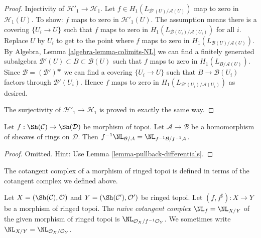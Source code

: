 \begin{proof}
\medskip\noindent
Injectivity of $\mathcal{H}'_1 \to \mathcal{H}_1$. Let
$f \in H_1(L_{\mathcal{B}'(U)/\mathcal{A}(U)})$ map to zero
in $\mathcal{H}_1(U)$. To show: $f$ maps to zero in
$\mathcal{H}'_1(U)$. The assumption means there is a covering
$\{U_i \to U\}$ such that $f$ maps to zero in
$H_1(L_{\mathcal{B}(U_i)/\mathcal{A}(U_i)})$ for all $i$.
Replace $U$ by $U_i$ to get to the point where $f$ maps to zero
in $H_1(L_{\mathcal{B}(U)/\mathcal{A}(U)})$.
By Algebra, Lemma \ref{algebra-lemma-colimits-NL}
we can find a finitely generated subalgebra
$\mathcal{B}'(U) \subset B \subset \mathcal{B}(U)$ such
that $f$ maps to zero in $H_1(L_{B/\mathcal{A}(U)})$.
Since $\mathcal{B} = (\mathcal{B}')^\#$ we can find a covering
$\{U_i \to U\}$ such that $B \to \mathcal{B}(U_i)$ factors
through $\mathcal{B}'(U_i)$. Hence $f$ maps to zero in
$H_1(L_{\mathcal{B}'(U_i)/\mathcal{A}(U_i)})$ as desired.

\medskip\noindent
The surjectivity of $\mathcal{H}'_1 \to \mathcal{H}_1$ is proved
in exactly the same way.
\end{proof}

\begin{lemma}
\label{lemma-pullback-NL}
Let $f : \Sh(\mathcal{C}) \to \Sh(\mathcal{D})$ be morphism of topoi.
Let $\mathcal{A} \to \mathcal{B}$ be a homomorphism of sheaves of rings
on $\mathcal{D}$. Then $f^{-1}\NL_{\mathcal{B}/\mathcal{A}} =
\NL_{f^{-1}\mathcal{B}/f^{-1}\mathcal{A}}$.
\end{lemma}

\begin{proof}
Omitted. Hint: Use Lemma \ref{lemma-pullback-differentials}.
\end{proof}

\noindent
The cotangent complex of a morphism of ringed topoi is defined
in terms of the cotangent complex we defined above.

\begin{definition}
\label{definition-cotangent-complex-morphism-ringed-topoi}
Let $X = (\Sh(\mathcal{C}), \mathcal{O})$ and
$Y = (\Sh(\mathcal{C}'), \mathcal{O}')$ be ringed topoi.
Let $(f, f^\sharp) : X \to Y$ be a morphism of ringed topoi.
The {\it naive cotangent complex} $\NL_f = \NL_{X/Y}$
of the given morphism of ringed topoi is
$\NL_{\mathcal{O}_X/f^{-1}\mathcal{O}_Y}$.
We sometimes write $\NL_{X/Y} = \NL_{\mathcal{O}_X/\mathcal{O}_Y}$.
\end{definition}









